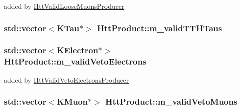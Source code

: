 added by \hyperlink{classHttValidLooseMuonsProducer}{HttValidLooseMuonsProducer} \hypertarget{classHttProduct_a42f077b59a010e311381923b680bd2c2}{
\subsubsection[{m\_\-validTTHTaus}]{\setlength{\rightskip}{0pt plus 5cm}std::vector$<$KTau$\ast$$>$ {\bf HttProduct::m\_\-validTTHTaus}}}
\label{classHttProduct_a42f077b59a010e311381923b680bd2c2}
\hypertarget{classHttProduct_a3450684de78cac75697b14e7dd778fbe}{
\subsubsection[{m\_\-validVetoElectrons}]{\setlength{\rightskip}{0pt plus 5cm}std::vector$<$KElectron$\ast$$>$ {\bf HttProduct::m\_\-validVetoElectrons}}}
\label{classHttProduct_a3450684de78cac75697b14e7dd778fbe}


added by \hyperlink{classHttValidVetoElectronsProducer}{HttValidVetoElectronsProducer} \hypertarget{classHttProduct_ae4fc7a166cfb5909aedb1088bd7957c2}{
\subsubsection[{m\_\-validVetoMuons}]{\setlength{\rightskip}{0pt plus 5cm}std::vector$<$KMuon$\ast$$>$ {\bf HttProduct::m\_\-validVetoMuons}}}
\label{classHttProduct_ae4fc7a166cfb5909aedb1088bd7957c2}


